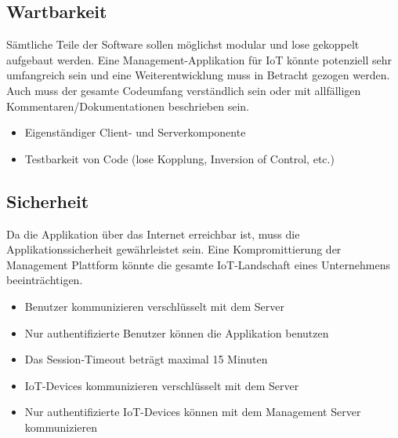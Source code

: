 \subsection{Wartbarkeit}
Sämtliche Teile der Software sollen möglichst modular und lose gekoppelt aufgebaut werden. Eine Management-Applikation für IoT könnte potenziell sehr umfangreich sein und eine Weiterentwicklung muss in Betracht gezogen werden. Auch muss der gesamte Codeumfang verständlich sein oder mit allfälligen Kommentaren/Dokumentationen beschrieben sein.
\begin{itemize}
\item Eigenständiger Client- und Serverkomponente
\item Testbarkeit von Code (lose Kopplung, Inversion of Control, etc.)
\end{itemize}

\subsection{Sicherheit}
Da die Applikation über das Internet erreichbar ist, muss die Applikationssicherheit gewährleistet sein. Eine Kompromittierung der Management Plattform könnte die gesamte IoT-Landschaft eines Unternehmens beeinträchtigen.

\begin{itemize}
\item Benutzer kommunizieren verschlüsselt mit dem Server
\item Nur authentifizierte Benutzer können die Applikation benutzen
\item Das Session-Timeout beträgt maximal 15 Minuten
\item IoT-Devices kommunizieren verschlüsselt mit dem Server
\item Nur authentifizierte IoT-Devices können mit dem Management Server kommunizieren
\end{itemize}